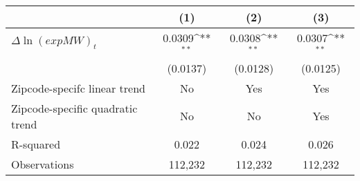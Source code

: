 {
\def\sym#1{\ifmmode^{#1}\else\(^{#1}\)\fi}
\begin{tabular}{l*{3}{c}}
\hline\hline
          &\multicolumn{1}{c}{(1)}         &\multicolumn{1}{c}{(2)}         &\multicolumn{1}{c}{(3)}         \\
\hline
$\Delta \ln(exp MW)_{t}$&   0.0309\sym{**} &   0.0308\sym{**} &   0.0307\sym{**} \\
          & (0.0137)         & (0.0128)         & (0.0125)         \\
\hline
Zipcode-specifc linear trend&       No         &      Yes         &      Yes         \\
Zipcode-specific quadratic trend&       No         &       No         &      Yes         \\
R-squared &    0.022         &    0.024         &    0.026         \\
Observations&  112,232         &  112,232         &  112,232         \\
\hline\hline
\end{tabular}
}
